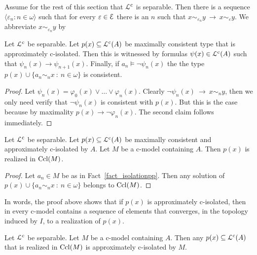 \documentclass{amsproc}
\renewcommand*{\emph}[1]{%
   \smash{\tikz[baseline]\node[rectangle, fill=teal!25, rounded corners, inner xsep=0.5ex, inner ysep=0.2ex, anchor=base, minimum height = 2.7ex]{\strut #1};}}
\begin{document}
{Assume for the rest of this section that ${\EuScript L}^{\rm c}$ is separable.
Then there is a sequence $\langle\varepsilon_n:n\in\omega\rangle$ such that for every $\varepsilon\in{\EuScript E}$ there is an $n$ such that $x\sim_{\varepsilon_n}y\ \rightarrow\ x\sim_\varepsilon\! y$.
We abbreviate $x\sim_{\varepsilon_n}y$ by \emph{$x\sim_ny$.}

\begin{fact}\label{fact_isolationpp}
  Let ${\EuScript L}^{\rm c}$ be separable.
  Let $p(x)\subseteq{\EuScript L}^{\rm c}(A)$ be maximally consistent type that is approximately c-isolated.
  Then this is witnessed by formulas $\psi(x)\in{\EuScript L}^{\rm c}(A)$ such that $\psi_n(x)\rightarrow\psi_{n+1}(x)$.
  Finally, if $a_n\models\neg\psi_n(x)$ the the type $p(x)\cup\big\{a_n\sim_nx\ :\ n\in\omega\big\}$ is consistent.
\end{fact}

\begin{proof}
  Let $\psi_n(x)=\varphi_0(x)\vee\dots\vee\varphi_n(x)$.
  Clearly $\neg\psi_n(x)\ \rightarrow\ x\sim_n\! y$, then we only need verify that $\neg\psi_n(x)$ is consistent with $p(x)$.
  But this is the case because by maximality $p(x)\rightarrow\neg\varphi_n(x)$.
  The second claim follows immediately.
\end{proof}



\begin{fact}\label{fact_sim_n}
  Let ${\EuScript L}^{\rm c}$ be separable.
  Let $p(x)\subseteq{\EuScript L}^{\rm c}(A)$ be maximally consistent and approximately c-isolated by $A$.
  Let $M$ be a c-model containing $A$.
  Then $p(x)$ is realized in ${\rm Ccl}(M)$.
\end{fact}

\begin{proof}
  Let $a_n\in M$ be as in Fact~\ref{fact_isolationpp}.
  Then any solution of $p(x)\cup\big\{a_n\sim_nx\ :\ n\in\omega\big\}$ belongs to ${\rm Ccl}(M)$.
\end{proof}

In words, the proof above shows that if $p(x)$ is approximately c-isolated, then in every c-model contains a sequence of elements that converges, in the topology induced by $I$, to a realization of $p(x)$.

\begin{fact}\label{fact_wcisolatio_realization}
  Let ${\EuScript L}^{\rm c}$ be separable.
  Let $M$ be a c-model containing $A$.
  Then any $p(x)\subseteq{\EuScript L}^{\rm c}(A)$ that is realized in ${\rm Ccl}(M)$ is approximately c-isolated by $M$.
\end{fact}

}
\end{document}
